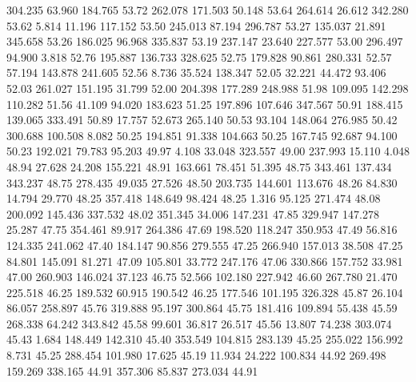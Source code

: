  304.235   63.960  184.765        53.72
 262.078  171.503   50.148        53.64
 264.614   26.612  342.280        53.62
   5.814   11.196  117.152        53.50
 245.013   87.194  296.787        53.27
 135.037   21.891  345.658        53.26
 186.025   96.968  335.837        53.19
 237.147   23.640  227.577        53.00
 296.497   94.900    3.818        52.76
 195.887  136.733  328.625        52.75
 179.828   90.861  280.331        52.57
  57.194  143.878  241.605        52.56
   8.736   35.524  138.347        52.05
  32.221   44.472   93.406        52.03
 261.027  151.195   31.799        52.00
 204.398  177.289  248.988        51.98
 109.095  142.298  110.282        51.56
  41.109   94.020  183.623        51.25
 197.896  107.646  347.567        50.91
 188.415  139.065  333.491        50.89
  17.757   52.673  265.140        50.53
  93.104  148.064  276.985        50.42
 300.688  100.508    8.082        50.25
 194.851   91.338  104.663        50.25
 167.745   92.687   94.100        50.23
 192.021   79.783   95.203        49.97
   4.108   33.048  323.557        49.00
 237.993   15.110    4.048        48.94
  27.628   24.208  155.221        48.91
 163.661   78.451   51.395        48.75
 343.461  137.434  343.237        48.75
 278.435   49.035   27.526        48.50
 203.735  144.601  113.676        48.26
  84.830   14.794   29.770        48.25
 357.418  148.649   98.424        48.25
   1.316   95.125  271.474        48.08
 200.092  145.436  337.532        48.02
 351.345   34.006  147.231        47.85
 329.947  147.278   25.287        47.75
 354.461   89.917  264.386        47.69
 198.520  118.247  350.953        47.49
  56.816  124.335  241.062        47.40
 184.147   90.856  279.555        47.25
 266.940  157.013   38.508        47.25
  84.801  145.091   81.271        47.09
 105.801   33.772  247.176        47.06
 330.866  157.752   33.981        47.00
 260.903  146.024   37.123        46.75
  52.566  102.180  227.942        46.60
 267.780   21.470  225.518        46.25
 189.532   60.915  190.542        46.25
 177.546  101.195  326.328        45.87
  26.104   86.057  258.897        45.76
 319.888   95.197  300.864        45.75
 181.416  109.894   55.438        45.59
 268.338   64.242  343.842        45.58
  99.601   36.817   26.517        45.56
  13.807   74.238  303.074        45.43
   1.684  148.449  142.310        45.40
 353.549  104.815  283.139        45.25
 255.022  156.992    8.731        45.25
 288.454  101.980   17.625        45.19
  11.934   24.222  100.834        44.92
 269.498  159.269  338.165        44.91
 357.306   85.837  273.034        44.91

